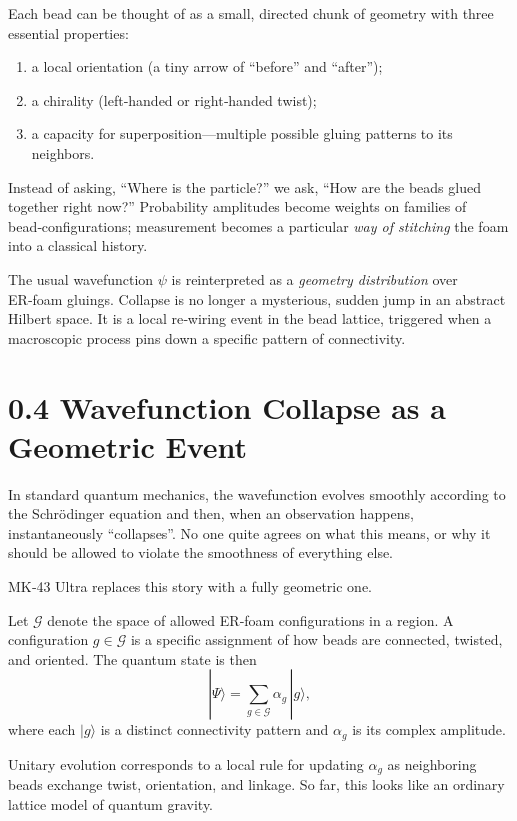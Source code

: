 Each bead can be thought of as a small, directed chunk of geometry with three essential properties:
\begin{enumerate}
  \item a local orientation (a tiny arrow of ``before'' and ``after'');
  \item a chirality (left‑handed or right‑handed twist);
  \item a capacity for superposition---multiple possible gluing patterns to its neighbors.
\end{enumerate}

Instead of asking, ``Where is the particle?'' we ask, ``How are the beads glued together right now?'' Probability amplitudes become weights on families of bead‑configurations; measurement becomes a particular \emph{way of stitching} the foam into a classical history.

The usual wavefunction $\psi$ is reinterpreted as a \emph{geometry distribution} over ER‑foam gluings. Collapse is no longer a mysterious, sudden jump in an abstract Hilbert space. It is a local re‑wiring event in the bead lattice, triggered when a macroscopic process pins down a specific pattern of connectivity.

\section*{0.4 Wavefunction Collapse as a Geometric Event}

In standard quantum mechanics, the wavefunction evolves smoothly according to the Schrödinger equation and then, when an observation happens, instantaneously ``collapses''. No one quite agrees on what this means, or why it should be allowed to violate the smoothness of everything else.

MK‑43 Ultra replaces this story with a fully geometric one.

Let $\mathcal{G}$ denote the space of allowed ER‑foam configurations in a region. A configuration $g \in \mathcal{G}$ is a specific assignment of how beads are connected, twisted, and oriented. The quantum state is then
\begin{equation}
|\Psi\rangle = \sum_{g \in \mathcal{G}} \alpha_g \, |g\rangle,
\end{equation}
where each $|g\rangle$ is a distinct connectivity pattern and $\alpha_g$ is its complex amplitude.

Unitary evolution corresponds to a local rule for updating $\alpha_g$ as neighboring beads exchange twist, orientation, and linkage. So far, this looks like an ordinary lattice model of quantum gravity.

